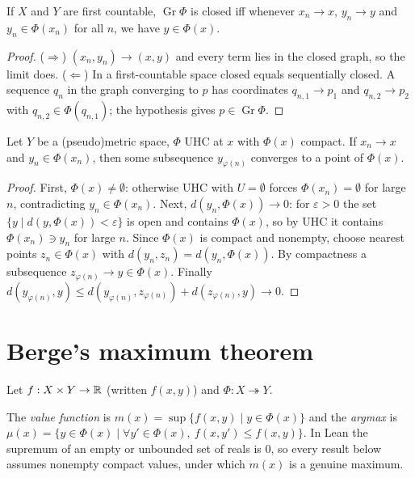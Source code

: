 \begin{proposition}
\label{prop:closed_graph_seq}
\leanok
{}
If $X$ and $Y$ are first countable, $\operatorname{Gr}\Phi$ is closed iff whenever $x_n \to x$,
$y_n \to y$ and $y_n \in \Phi(x_n)$ for all $n$, we have $y \in \Phi(x)$.
\end{proposition}
\begin{proof}
\leanok
($\Rightarrow$) $(x_n, y_n) \to (x, y)$ and every term lies in the closed graph, so the limit does.
($\Leftarrow$) In a first-countable space closed equals sequentially closed. A sequence $q_n$ in the
graph converging to $p$ has coordinates $q_{n,1} \to p_1$ and $q_{n,2} \to p_2$ with
$q_{n,2} \in \Phi(q_{n,1})$; the hypothesis gives $p \in \operatorname{Gr}\Phi$.
\end{proof}

\begin{proposition}
\label{prop:uhc_subseq}
\leanok
{}
Let $Y$ be a (pseudo)metric space, $\Phi$ UHC at $x$ with $\Phi(x)$ compact. If $x_n \to x$ and
$y_n \in \Phi(x_n)$, then some subsequence $y_{\varphi(n)}$ converges to a point of $\Phi(x)$.
\end{proposition}
\begin{proof}
\leanok
First, $\Phi(x) \neq \emptyset$: otherwise UHC with $U = \emptyset$ forces $\Phi(x_n) = \emptyset$ for
large $n$, contradicting $y_n \in \Phi(x_n)$. Next, $d(y_n, \Phi(x)) \to 0$: for $\varepsilon > 0$ the set
$\{y \mid d(y, \Phi(x)) < \varepsilon\}$ is open and contains $\Phi(x)$, so by UHC it contains
$\Phi(x_n) \ni y_n$ for large $n$. Since $\Phi(x)$ is compact and nonempty, choose nearest points
$z_n \in \Phi(x)$ with $d(y_n, z_n) = d(y_n, \Phi(x))$. By compactness a subsequence
$z_{\varphi(n)} \to y \in \Phi(x)$. Finally
$d(y_{\varphi(n)}, y) \le d(y_{\varphi(n)}, z_{\varphi(n)}) + d(z_{\varphi(n)}, y) \to 0$.
\end{proof}

\section{Berge's maximum theorem}
\label{sec:berge}

Let $f : X \times Y \to \mathbb{R}$ (written $f(x, y)$) and $\Phi : X \twoheadrightarrow Y$.

\begin{definition}
\label{def:maxValue}
\leanok
The \emph{value function} is $m(x) = \sup\{f(x, y) \mid y \in \Phi(x)\}$ and the \emph{argmax} is
$\mu(x) = \{y \in \Phi(x) \mid \forall y' \in \Phi(x),\ f(x, y') \le f(x, y)\}$.
In Lean the supremum of an empty or unbounded set of reals is $0$, so every result below assumes
nonempty compact values, under which $m(x)$ is a genuine maximum.
\end{definition}

